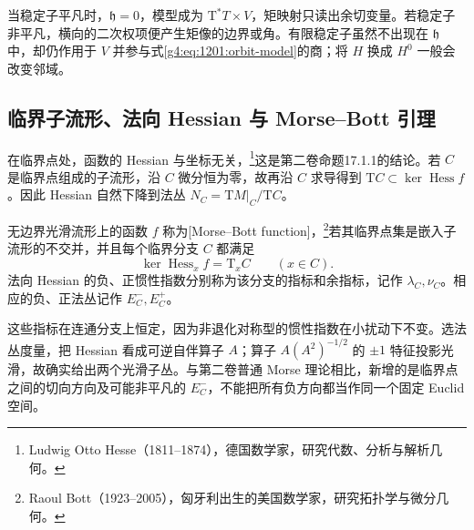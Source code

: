 当稳定子平凡时，\(\mathfrak h=0\)，模型成为 \(\mathrm T^*T\times V\)，矩映射只读出余切变量。若稳定子非平凡，横向的二次权项便产生矩像的边界或角。有限稳定子虽然不出现在 \(\mathfrak h\) 中，却仍作用于 \(V\) 并参与式\eqref{g4:eq:1201:orbit-model}的商；将 \(H\) 换成 \(H^0\) 一般会改变邻域。

\subsection{临界子流形、法向 Hessian 与 Morse–Bott 引理}
\label{g4:subsec:1201:03}

在临界点处，函数的 Hessian 与坐标无关，\footnote{Ludwig Otto Hesse（1811--1874），德国数学家，研究代数、分析与解析几何。}这是第二卷命题17.1.1的结论。若 \(C\) 是临界点组成的子流形，沿 \(C\) 微分恒为零，故再沿 \(C\) 求导得到 \(\mathrm T C\subset\ker\operatorname{Hess}f\)。因此 Hessian 自然下降到法丛 \(N_C=\mathrm TM|_C/\mathrm TC\)。

\begin{definition}\label{g4:def:1201:morse-bott}
	无边界光滑流形上的函数 \(f\) 称为[Morse--Bott function]，\footnote{Raoul Bott（1923--2005），匈牙利出生的美国数学家，研究拓扑学与微分几何。}若其临界点集是嵌入子流形的不交并，并且每个临界分支 \(C\) 都满足
	\[
		\ker\operatorname{Hess}_x f=\mathrm T_xC\qquad(x\in C).
	\]
	法向 Hessian 的负、正惯性指数分别称为该分支的指标和余指标，记作 \(\lambda_C,\nu_C\)。相应的负、正法丛记作 \(E_C^-,E_C^+\)。
\end{definition}

这些指标在连通分支上恒定，因为非退化对称型的惯性指数在小扰动下不变。选法丛度量，把 Hessian 看成可逆自伴算子 \(A\)；算子 \(A(A^2)^{-1/2}\) 的 \(\pm1\) 特征投影光滑，故确实给出两个光滑子丛。与第二卷普通 Morse 理论相比，新增的是临界点之间的切向方向及可能非平凡的 \(E_C^-\)，不能把所有负方向都当作同一个固定 Euclid 空间。

